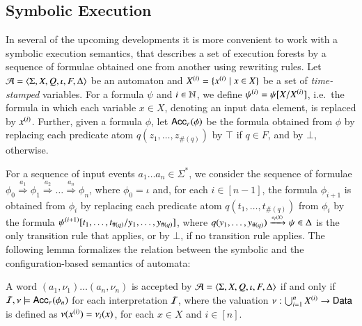 \documentclass{llncs}
\begin{document}
\subsection{Symbolic Execution}

In several of the upcoming developments it is more convenient to work
with a symbolic execution semantics, that describes a set of execution
forests by a sequence of formulae obtained one from another using
rewriting rules. Let $\mathcal{A} = \langle \Sigma,X,Q,\iota,F,\Delta \rangle$ be an
automaton and ${X}^{({i})} = \{ {x}^{({i})} \mid x \in X \}$ be a
set of \emph{time-stamped} variables. For a formula $\psi$ and $i \in
{\bf \mathbb{N}}$, we define ${\psi}^{({i})} = \psi[X/{X}^{({i})}]$, i.e.\ the
formula in which each variable $x \in X$, denoting an input data
element, is replaced by ${x}^{({i})}$. Further, given a formula
$\phi$, let $\mathsf{Acc}_{\scriptscriptstyle{F}}({\phi})$ be the formula obtained from $\phi$ by
replacing each predicate atom $q(z_1,\ldots,z_{\#(q)})$ by $\top$ if
$q \in F$, and by $\bot$, otherwise.

For a sequence of input events $a_1 \ldots a_n \in \Sigma^*$, we
consider the sequence of formulae \(\phi_0 \stackrel{a_1}{\Rightarrow}
\phi_1 \stackrel{a_2}{\Rightarrow} \ldots \stackrel{a_n}{\Rightarrow}
\phi_n\), where $\phi_0 = \iota$ and, for each $i \in [n-1]$, the
formula $\phi_{i+1}$ is obtained from $\phi_i$ by replacing each
predicate atom $q(t_1,\ldots,t_{\#(q)})$ from $\phi_i$ by the formula
${\psi}^{({i+1})}[t_1, \ldots, t_{\#(q)}/y_1,\ldots,y_{\#(q)}]$,
where $q(y_1,\ldots,y_{\#(q)}) \xrightarrow{{\scriptscriptstyle a_i(X)}}_{{\scriptstyle }} \psi \in \Delta$ is
the only transition rule that applies, or by $\bot$, if no transition
rule applies. The following lemma formalizes the relation between the
symbolic and the configuration-based semantics of automata:

\begin{lemma}\label{lemma:symbolic-execution}
  A word $(a_1,\nu_1) \ldots (a_n,\nu_n)$ is accepted by $\mathcal{A} =
  \langle \Sigma,X,Q,\iota,F,\Delta \rangle$ if and only if $\mathcal{I},\nu \models
  \mathsf{Acc}_{\scriptscriptstyle{F}}({\phi_n})$ for each interpretation $\mathcal{I}$, where the
  valuation $\nu : \bigcup_{i=1}^n {X}^{({i})} \rightarrow \mathsf{Data}$ is
  defined as $\nu({x}^{({i})}) = \nu_i(x)$, for each $x \in X$ and $i
  \in [n]$.
\end{lemma}
\end{document}
